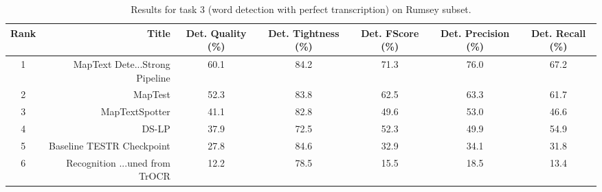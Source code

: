 \begin{table}
\caption{Results for task 3 (word detection with perfect transcription) on Rumsey subset.}
\begin{tabular}{crccccc}
\toprule
Rank & Title & Det. Quality (\%) & Det. Tightness (\%) & Det. FScore (\%) & Det. Precision (\%) & Det. Recall (\%) \\
\midrule
1 & MapText Dete...Strong Pipeline & 60.1 & 84.2 & 71.3 & 76.0 & 67.2 \\
2 & MapTest & 52.3 & 83.8 & 62.5 & 63.3 & 61.7 \\
3 & MapTextSpotter & 41.1 & 82.8 & 49.6 & 53.0 & 46.6 \\
4 & DS-LP & 37.9 & 72.5 & 52.3 & 49.9 & 54.9 \\
5 & Baseline TESTR Checkpoint & 27.8 & 84.6 & 32.9 & 34.1 & 31.8 \\
6 & Recognition ...uned from TrOCR & 12.2 & 78.5 & 15.5 & 18.5 & 13.4 \\
\bottomrule
\end{tabular}
\end{table}
